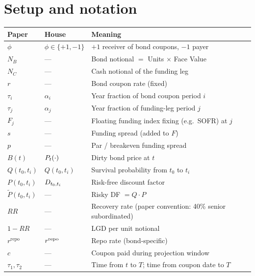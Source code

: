 \documentclass[11pt,a4paper]{article}
\begin{document}
\section{Setup and notation}

\begin{tabular}{@{}p{3cm}p{3.5cm}p{8.5cm}@{}}
\toprule
Paper                 & House                        & Meaning \\
\midrule
$\phi$                & $\phi \in \{+1, -1\}$        & $+1$ receiver of bond coupons, $-1$ payer \\
$N_B$                 & ---                          & Bond notional $=$ Units $\times$ Face Value \\
$N_C$                 & ---                          & Cash notional of the funding leg \\
$r$                   & ---                          & Bond coupon rate (fixed) \\
$\tau_i$              & $\alpha_i$                   & Year fraction of bond coupon period $i$ \\
$\tau_j$              & $\alpha_j$                   & Year fraction of funding-leg period $j$ \\
$F_j$                 & ---                          & Floating funding index fixing (e.g.\ SOFR) at $j$ \\
$s$                   & ---                          & Funding spread (added to $F$) \\
$p$                   & ---                          & Par / breakeven funding spread \\
$B(t)$                & $P_{t}(\cdot)$            & Dirty bond price at $t$ \\
$Q(t_0, t_i)$         & $Q(t_0, t_i)$                & Survival probability from $t_0$ to $t_i$ \\
$P(t_0, t_i)$         & $D_{t_0,t_i}$            & Risk-free discount factor \\
$\widetilde P(t_0, t_i)$ & ---                       & Risky DF $= Q \cdot P$ \\
$RR$                  & ---                          & Recovery rate (paper convention: 40\% senior subordinated) \\
$1 - RR$              & ---                          & LGD per unit notional \\
$r^{\text{repo}}$     & $r^{\mathrm{repo}}$                      & Repo rate (bond-specific) \\
$c$                   & ---                          & Coupon paid during projection window \\
$\tau_1, \tau_2$      & ---                          & Time from $t$ to $T$; time from coupon date to $T$ \\
\bottomrule
\end{tabular}
\end{document}
